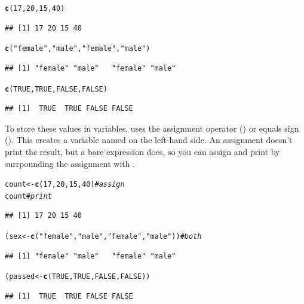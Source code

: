 \documentclass[11pt]{book}\usepackage[]{graphicx}\usepackage[]{color}
\makeatletter
\newcommand{\hlnum}[1]{\textcolor[rgb]{0.686,0.059,0.569}{#1}}%
\newcommand{\hlstr}[1]{\textcolor[rgb]{0.192,0.494,0.8}{#1}}%
\newcommand{\hlcom}[1]{\textcolor[rgb]{0.678,0.584,0.686}{\textit{#1}}}%
\newcommand{\hlstd}[1]{\textcolor[rgb]{0.345,0.345,0.345}{#1}}%
\newcommand{\hlkwb}[1]{\textcolor[rgb]{0.69,0.353,0.396}{#1}}%
\newcommand{\hlkwd}[1]{\textcolor[rgb]{0.737,0.353,0.396}{\textbf{#1}}}%
\newenvironment{kframe}{%
 \def\at@end@of@kframe{}%
 \ifinner\ifhmode%
  \def\at@end@of@kframe{\end{minipage}}%
  \begin{minipage}{\columnwidth}%
 \fi\fi%
 \def\FrameCommand##1{\hskip\@totalleftmargin \hskip-\fboxsep
 \colorbox{shadecolor}{##1}\hskip-\fboxsep
     \hskip-\linewidth \hskip-\@totalleftmargin \hskip\columnwidth}%
 \MakeFramed {\advance\hsize-\width
   \@totalleftmargin\z@ \linewidth\hsize
   \@setminipage}}%
 {\par\unskip\endMakeFramed%
 \at@end@of@kframe}
\newenvironment{knitrout}{}{} %
\renewenvironment{knitrout}{\small\renewcommand{\baselinestretch}{.85}}{} %
\makeatother
\begin{document}
\begin{knitrout}
\color{fgcolor}\begin{kframe}
\begin{alltt}
\hlkwd{c}\hlstd{(}\hlnum{17}\hlstd{,} \hlnum{20}\hlstd{,} \hlnum{15}\hlstd{,} \hlnum{40}\hlstd{)}
\end{alltt}
\begin{verbatim}
## [1] 17 20 15 40
\end{verbatim}
\begin{alltt}
\hlkwd{c}\hlstd{(}\hlstr{"female"}\hlstd{,} \hlstr{"male"}\hlstd{,} \hlstr{"female"}\hlstd{,} \hlstr{"male"}\hlstd{)}
\end{alltt}
\begin{verbatim}
## [1] "female" "male"   "female" "male"
\end{verbatim}
\begin{alltt}
\hlkwd{c}\hlstd{(}\hlnum{TRUE}\hlstd{,} \hlnum{TRUE}\hlstd{,} \hlnum{FALSE}\hlstd{,} \hlnum{FALSE}\hlstd{)}
\end{alltt}
\begin{verbatim}
## [1]  TRUE  TRUE FALSE FALSE
\end{verbatim}
\end{kframe}
\end{knitrout}


To store these values in variables, \R uses the assignment operator (\code{<-})
or equals sign (\code{=}). This creates a variable named on the left-hand side.
An assignment doesn't print the result, but a bare expression does, so you can
assign and print by surrpounding the assignment with \code{()}.

\begin{knitrout}
\color{fgcolor}\begin{kframe}
\begin{alltt}
\hlstd{count} \hlkwb{<-} \hlkwd{c}\hlstd{(}\hlnum{17}\hlstd{,} \hlnum{20}\hlstd{,} \hlnum{15}\hlstd{,} \hlnum{40}\hlstd{)}                       \hlcom{# assign}
\hlstd{count}                                            \hlcom{# print}
\end{alltt}
\begin{verbatim}
## [1] 17 20 15 40
\end{verbatim}
\begin{alltt}
\hlstd{(sex} \hlkwb{<-} \hlkwd{c}\hlstd{(}\hlstr{"female"}\hlstd{,} \hlstr{"male"}\hlstd{,} \hlstr{"female"}\hlstd{,} \hlstr{"male"}\hlstd{))}   \hlcom{# both}
\end{alltt}
\begin{verbatim}
## [1] "female" "male"   "female" "male"
\end{verbatim}
\begin{alltt}
\hlstd{(passed} \hlkwb{<-} \hlkwd{c}\hlstd{(}\hlnum{TRUE}\hlstd{,} \hlnum{TRUE}\hlstd{,} \hlnum{FALSE}\hlstd{,} \hlnum{FALSE}\hlstd{))}
\end{alltt}
\begin{verbatim}
## [1]  TRUE  TRUE FALSE FALSE
\end{verbatim}
\end{kframe}
\end{knitrout}
\end{document}
